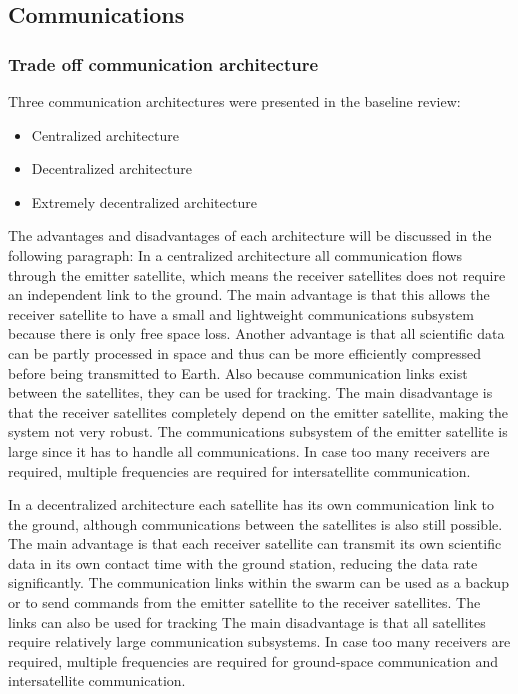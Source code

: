\subsection{\ac{Communications}}
\label{mtrTOCOM}

\subsubsection{Trade off communication architecture}
Three communication architectures were presented in the baseline review:
\begin{itemize}
\item Centralized architecture
\item Decentralized architecture
\item Extremely decentralized architecture
\end{itemize}

The advantages and disadvantages of each architecture will be discussed in the following paragraph:
In a centralized architecture all communication flows through the emitter satellite, which means the receiver satellites does not require an independent link to the ground.
The main advantage is that this allows the receiver satellite to have a small and lightweight communications subsystem because there is only free space loss. Another advantage is that all scientific data can be partly processed in space and thus can be more efficiently compressed before being transmitted to Earth. Also because communication links exist between the satellites, they can be used for tracking.
The main disadvantage is that the receiver satellites completely depend on the emitter satellite, making the system not very robust. The communications subsystem of the emitter satellite is large since it has to handle all communications. In case too many receivers are required, multiple frequencies are required for intersatellite communication.

In a decentralized architecture each satellite has its own communication link to the ground, although communications between the satellites is also still possible.
The main advantage is that each receiver satellite can transmit its own scientific data in its own contact time with the ground station, reducing the data rate significantly. The communication links within the swarm can be used as a backup or to send commands from the emitter satellite to the receiver satellites. The links can also be used for tracking
The main disadvantage is that all satellites require relatively large communication subsystems. In case too many receivers are required, multiple frequencies are required for ground-space communication and intersatellite communication.

